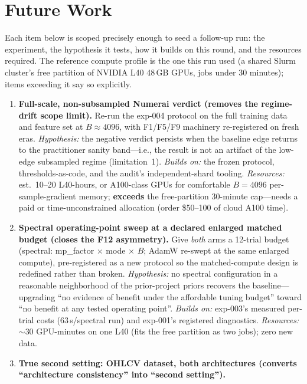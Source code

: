 \section{Future Work}
\label{sec:future-work}

Each item below is scoped precisely enough to seed a follow-up run: the
experiment, the hypothesis it tests, how it builds on this round, and the
resources required. The reference compute profile is the one this run used
(a shared Slurm cluster's free partition of NVIDIA L40 48\,GB GPUs, jobs
under 30 minutes); items exceeding it say so explicitly.

\begin{enumerate}
  \item \textbf{Full-scale, non-subsampled Numerai verdict (removes the
    regime-drift scope limit).} Re-run the exp-004 protocol on the full
    training data and feature set at $B \approx 4096$, with F1/F5/F9
    machinery re-registered on fresh eras. \emph{Hypothesis:} the negative
    verdict persists when the baseline edge returns to the practitioner
    sanity band---i.e., the result is not an artifact of the low-edge
    subsampled regime (limitation~1). \emph{Builds on:} the frozen
    protocol, thresholds-as-code, and the audit's independent-shard
    tooling. \emph{Resources:} est.\ 10--20 L40-hours, or A100-class
    GPUs for comfortable $B{=}4096$ per-sample-gradient memory;
    \textbf{exceeds} the free-partition 30-minute cap---needs a paid or
    time-unconstrained allocation (order \$50--100 of cloud A100 time).
  \item \textbf{Spectral operating-point sweep at a declared enlarged
    matched budget (closes the F12 asymmetry).} Give \emph{both} arms a
    12-trial budget (spectral: mp\_factor $\times$ mode $\times$ $B$;
    AdamW re-swept at the same enlarged compute), pre-registered as a new
    protocol so the matched-compute design is redefined rather than
    broken. \emph{Hypothesis:} no spectral configuration in a reasonable
    neighborhood of the prior-project priors recovers the baseline---
    upgrading ``no evidence of benefit under the affordable tuning
    budget'' toward ``no benefit at any tested operating point''.
    \emph{Builds on:} exp-003's measured per-trial costs (63\,s/spectral
    run) and exp-001's registered diagnostics. \emph{Resources:}
    $\sim$30 GPU-minutes on one L40 (fits the free partition as two
    jobs); zero new data.
  \item \textbf{True second setting: OHLCV dataset, both architectures
    (converts ``architecture consistency'' into ``second setting'').}

\end{enumerate}
